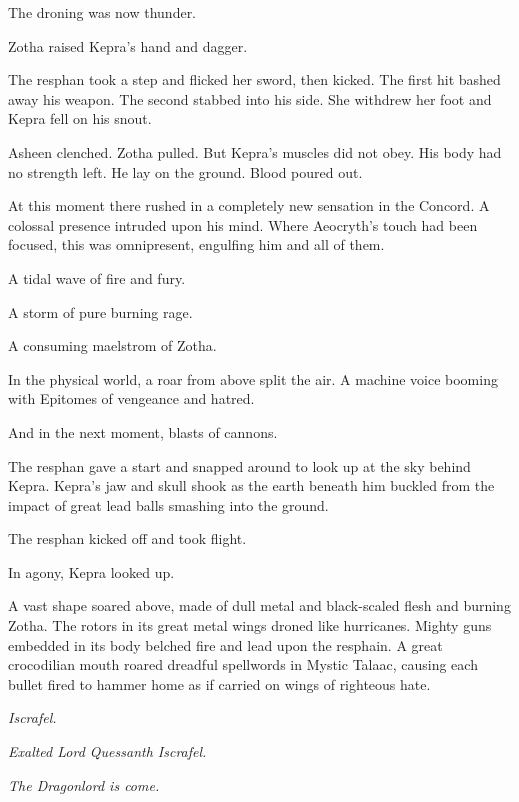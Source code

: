 \documentclass
  [a4paper,
   12pt,
   oneside
  ]%
  {article}
\begin{document}
The droning was now thunder.

Zotha raised Kepra's hand and dagger. 

The resphan took a step and flicked her sword, then kicked. The first hit bashed away his weapon. The second stabbed into his side. 
She withdrew her foot and
Kepra fell on his snout. 

Asheen clenched. Zotha pulled. But Kepra's muscles did not obey.
His body had no strength left.
He lay on the ground.
Blood poured out.

At this moment there rushed in a completely new sensation in the Concord. 
A colossal presence intruded upon his mind.
Where Aeocryth's touch had been focused, this was omnipresent, engulfing him and all of them.

A tidal wave of fire and fury. 

A storm of pure burning rage.

A consuming maelstrom of Zotha.

In the physical world, a roar from above split the air. 
A machine voice booming with Epitomes of vengeance and hatred.

And in the next moment, blasts of cannons. 

The resphan gave a start and snapped around to look up at the sky behind Kepra. 
Kepra's jaw and skull shook as the earth beneath him buckled from the impact of great lead balls smashing into the ground. 

The resphan kicked off and took flight. 

In agony, Kepra looked up. 

A vast shape soared above, made of dull metal and black-scaled flesh and burning Zotha. 
The rotors in its great metal wings droned like hurricanes. 
Mighty guns embedded in its body belched fire and lead upon the resphain. 
A great crocodilian mouth roared dreadful spellwords in Mystic Talaac, causing each bullet fired to hammer home as if carried on wings of righteous hate. 

\emph{Iscrafel.} 

\emph{Exalted Lord Quessanth Iscrafel.} 

\emph{The Dragonlord is come.}

% 
% 
\end{document}

